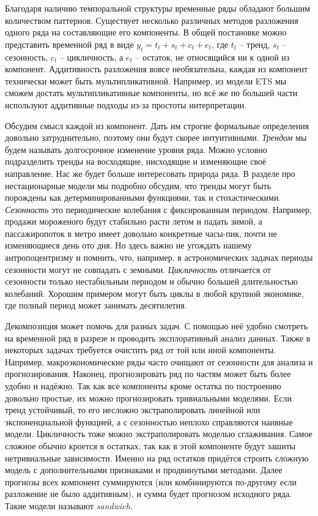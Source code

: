 \documentclass[12pt,fleqn]{article}
\begin{document}
Благодаря наличию темпоральной структуры временные ряды обладают большим количеством паттернов. Существует несколько различных методов разложения одного ряда на составляющие его компоненты. В общей постановке можно представить временной ряд в виде $y_t = t_t + s_t + c_t + e_t$, где $t_t$ -- тренд, $s_t$ -- сезонность,  $c_t$ -- цикличность, а $e_t$ -- остаток, не относящийся ни к одной из компонент. Аддитивность разложения вовсе необязательна, каждая из компонент технически может быть мультипликативной. Например, из модели ETS мы сможем достать мультипликативные компоненты, но всё же по большей части используют аддитивные подходы из-за простоты интерпретации.

 Обсудим смысл каждой из компонент. Дать им строгие формальные определения довольно затруднительно, поэтому они будут скорее интуитивными. \emph{Трендом} мы будем называть долгосрочное изменение уровня ряда. Можно условно подразделить тренды на восходящие, нисходящие и изменяющие своё направление. Нас же будет больше интересовать природа ряда. В разделе про нестационарные модели мы подробно обсудим, что тренды могут быть порождены как детерминированными функциями, так и стохастическими. \emph{Сезонность} это периодические колебания с фиксированным периодом. Например, продажи мороженого будут стабильно расти летом и падать зимой, а пассажиропоток в метро имеет довольно конкретные часы-пик, почти не изменяющиеся день ото дня. Но здесь важно не угождать нашему антропоцентризму и помнить, что, например, в астрономических задачах периоды сезонности могут не совпадать с земными. \emph{Цикличность} отличается от сезонности только нестабильным периодом и обычно большей длительностью колебаний. Хорошим примером могут быть циклы в любой крупной экономике, где полный период может занимать десятилетия.
 
 Декомпозиция может помочь для разных задач. С помощью неё удобно смотреть на временной ряд в разрезе и проводить эксплоративный анализ данных. Также в некоторых задачах требуется очистить ряд от той или иной компоненты. Например, макроэкономические ряды часто очищают от сезонности для анализа и прогнозирования. Наконец, прогнозировать ряд по частям может быть более удобно и надёжно. Так как все компоненты кроме остатка по построению довольно простые, их можно прогнозировать тривиальными моделями. Если тренд устойчивый, то его несложно экстраполировать линейной или экспоненциальной функцией, а с сезонностью неплохо справляются наивные модели. Цикличность тоже можно экстраполировать моделью сглаживания. Самое сложное обычно кроется в остатках, так как в этой компоненте будут зашиты нетривиальные зависимости. Именно на ряд остатков придётся строить сложную модель с дополнительными признаками и продвинутыми методами. Далее прогнозы всех компонент суммируются (или комбинируются по-другому если разложение не было аддитивным), и сумма будет прогнозом исходного ряда. Такие модели называют \emph{sandwich}.
\end{document}
